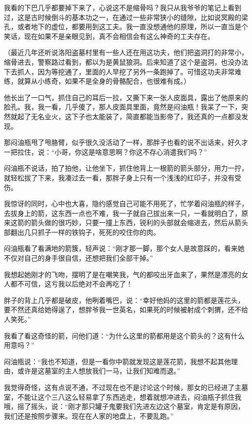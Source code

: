 我看的下巴几乎都要掉下来了，心说这不是缩骨吗？我只从我爷爷的笔记上看到过，这是古时候倒斗的基本功之一，在通过一些非常狭小的缝隙，比如说冥殿的梁孔，或者地下的虚位，都要用到这工夫。我一直没想通他的原理，所以一直当是个笑话，现在如果不是亲眼见到，真不会相信会有这么神奇的工夫存在。

（最近几年还听说洛阳盗墓村里有一些人还在用这功夫，他们把盗洞打的非常小，缩骨进去，警察路过看到，都以为是黄鼠狼洞。后来知道了这个是盗洞，也没办法下去抓人，因为等挖通了，里面的人早挖了另外一条跑掉了。可惜这功夫非常难练，就算从小练奇，如果不是全身的骨骼配合，也很难有成。）

他长出了一口气，抓住自己的耳后一拉，又撕下来一张人皮面具，露出了他原来的脸孔。我，我一看，几乎傻了，那人皮面具里面，竟然是闷油瓶！我呆了一下，突然就起了无名业火，这下子也太能装了，简直都能当影帝了，我还真的一点都没发现。

那闷油瓶甩了甩胳臂，似乎很久没活动了一样，那胖子也看的说不出话来，好久才一把拉住，说：“小哥，你这是啥意思啊？你这不存心消遣我们吗？”

闷油瓶不说话，拍了拍他，让他坐下，抓住他背上一根箭的箭头部分，用力一拧，就轻松拔了下来，我凑过去一看，那胖子身上只有一个浅浅的红印子，并没有受伤。

我惊讶的同时，心中也大喜，隐约感觉自己可能不用死了，忙学着闷油瓶的样子，去拔身上的箭，这东西一点也不难，我一子就自己拔出来一只，一看就明白了，原来这箭的箭头做的很巧妙，只要一撞上东西，锐利的头部就会缩进去，然后从箭头部翻出几只抓子一样的铁钩子，死死的咬住你的肉。

闷油瓶看了看满地的箭簇，轻声说：“刚才那一脚，那个女人是故意踩的，看来她不仅对自己的身手很自信，还想把我们全部干掉。”

我想起她刚才的飞吻，摆明了是在嘲笑我，气的都咬出牙血来了，果然是漂亮的女人都不可信，这亏我以后绝对不会再吃了！

胖子的背上几乎都是破皮，他咧着嘴巴，说：“幸好他妈的这里的箭都是莲花头，要不然还真给她得逞了，想胖爷我一世英名，如果死的时候被射成个刺猬，还不给人笑死。”

我看了看这奇怪的箭，问他们道：“为什么这里的箭都用是这个箭头的？这有什么用意吗？”

闷油瓶说：“我也不知道，但是一看你中箭就发现这是莲花箭，我想不起其他理由，或许是这墓室的主人想放我们一马，让我们知难而退。”

我觉得奇怪，这有点说不通，不过现在也不是讨论这个时候，那女的已经进了主墓室，不能让这个三八这么轻易拿了东西逃走，想着就想冲进去，闷油瓶子抓住我哦，摇了摇头，说：“刚才那只罐子鬼要我们先进左边这个墓室，肯定是有原因，我们还是按照步骤来。现在在人家的地盘上，不要乱跑。”

